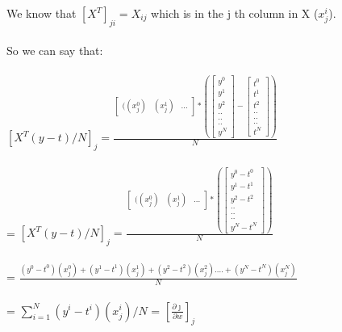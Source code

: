 \documentclass{article}
\begin{document}
        We know that $[X^T]_{ji} = X_{ij}$ which is in the j th column in X ($x_{j}^i$).\\\\
        So we can say that:\\\\
        $[X^T(y-t)/N]_{j} = \frac{\begin{bmatrix}((x_{j}^0) & (x_{j}^1) &...\end{bmatrix} * ( \begin{bmatrix}y^0 \\ y^1\\y^2\\..\\..\\..\\y^N \end{bmatrix} - \begin{bmatrix}t^0 \\ t^1\\t^2\\..\\..\\..\\t^N \end{bmatrix})}{N}$\\\\
        =  $[X^T(y-t)/N]_{j} = \frac{\begin{bmatrix}((x_{j}^0) & (x_{j}^1) &...\end{bmatrix} * ( \begin{bmatrix}y^0 - t^0 \\ y^1-t^1\\y^2-t^2\\..\\..\\..\\y^N-t^N \end{bmatrix})}{N}$\\\\
        = $ \frac{(y^0-t^0)(x_j^0)+(y^1-t^1)(x_j^1)+(y^2-t^2)(x_j^2)....+(y^N-t^N)(x_j^N)}{N}$ \\\\
        = $\sum_{i=1}^{N}(y^i-t^i)(x^i_j)/N$ = $[\frac{\partial\jmath}{\partial w}]_{j}$\\\\
        
\end{document}
